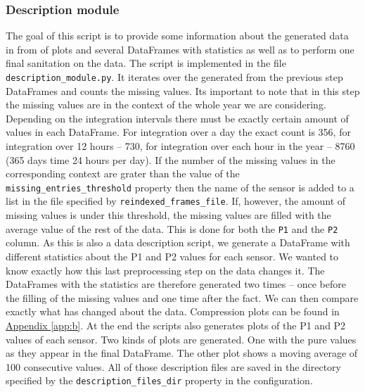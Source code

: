 \documentclass[12pt,a4paper,twoside]{scrartcl}
\numberwithin{equation}{section}
\newcommand{\refapp}[1]{\hyperref[#1]{Appendix \ref*{#1}}}
\begin{document}
\subsubsection{Description module}\label{sec:desc-module}
The goal of this script is to provide some information about the generated data in from of plots and several DataFrames with statistics as well as to perform one final sanitation on the data. The script is implemented in the file \texttt{description\_module.py}. It iterates over the generated from the previous step DataFrames and counts the missing values. Its important to note that in this step the missing values are in the context of the whole year we are considering. Depending on the integration intervals there must be exactly certain amount of values in each DataFrame. For integration over a day the exact count is 356, for integration over 12 hours -- 730, for integration over each hour in the year -- 8760 (365 days time 24 hours per day). If the number of the missing values in the corresponding context are grater than the value of the \texttt{missing\_entries\_threshold} property then the name of the sensor is added to a list in the file specified by \texttt{reindexed\_frames\_file}. If, however, the amount of missing values is under this threshold, the missing values are filled with the average value of the rest of the data. This is done for both the \texttt{P1} and the \texttt{P2} column. As this is also a data description script, we generate a DataFrame with different statistics about the P1 and P2 values for each sensor. We wanted to know exactly how this last preprocessing step on the data changes it. The DataFrames with the statistics are therefore generated two times -- once before the filling of the missing values and one time after the fact. We can then compare exactly what has changed about the data. Compression plots can be found in \refapp{app:b}. At the end the scripts also generates plots of the P1 and P2 values of each sensor. Two kinds of plots are generated. One with the pure values as they appear in the final DataFrame. The other plot shows a moving average of 100 consecutive values. All of those description files are saved in the directory specified by the \texttt{description\_files\_dir} property in the configuration.
\end{document}
